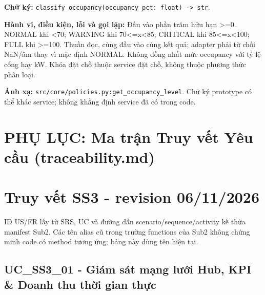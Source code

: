\documentclass[11pt,a4paper]{article}
\begin{document}
\textbf{Chữ ký:}
\texttt{classify\_occupancy(occupancy\_pct:\ float)\ -\textgreater{}\ str}.

\textbf{Hành vi, điều kiện, lỗi và gọi lặp:} Đầu vào phần trăm hữu hạn
\textgreater=0. NORMAL khi \textless70; WARNING khi
70\textless=x\textless85; CRITICAL khi 85\textless=x\textless100; FULL
khi \textgreater=100. Thuần đọc, cùng đầu vào cùng kết quả; adapter phải
từ chối NaN/âm thay vì mặc định NORMAL. Không đồng nhất mức occupancy
với tỷ lệ cổng hay kW. Khóa đặt chỗ thuộc service đặt chỗ, không thuộc
phương thức phân loại.

\textbf{Ánh xạ:} \texttt{src/core/policies.py:get\_occupancy\_level}.
Chữ ký prototype có thể khác service; không khẳng định service đã có
trong code.

\newpage
\section*{PHỤ LỤC: Ma trận Truy vết Yêu cầu (traceability.md)}
\hypertarget{truy-vux1ebft-ss3---revision-06112026}{%
\section{Truy vết SS3 - revision
06/11/2026}\label{truy-vux1ebft-ss3---revision-06112026}}

ID US/FR lấy từ SRS, UC và đường dẫn scenario/sequence/activity kế thừa
manifest Sub2. Các tên alias cũ trong trường functions của Sub2 không
chứng minh code có method tương ứng; bảng này dùng tên hiện tại.

\hypertarget{uc_ss3_01---giuxe1m-suxe1t-mux1ea1ng-lux1b0ux1edbi-hub-kpi-doanh-thu-thux1eddi-gian-thux1ef1c}{%
\subsection{UC\_SS3\_01 - Giám sát mạng lưới Hub, KPI \& Doanh thu thời
gian
thực}\label{uc_ss3_01---giuxe1m-suxe1t-mux1ea1ng-lux1b0ux1edbi-hub-kpi-doanh-thu-thux1eddi-gian-thux1ef1c}}
\end{document}
